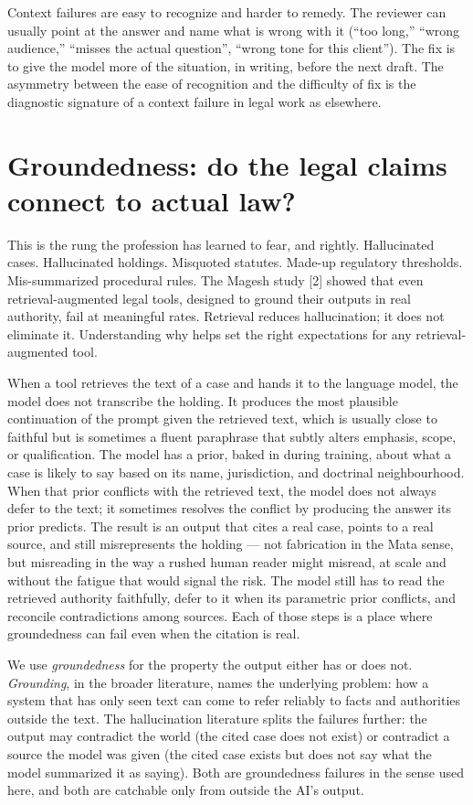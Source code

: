 \documentclass[11pt,a4paper]{article}
\begin{document}
Context failures are easy to recognize and harder to remedy. The
reviewer can usually point at the answer and name what is wrong
with it (``too long,'' ``wrong audience,'' ``misses the actual
question'', ``wrong tone for this client''). The fix is to give
the model more of the situation, in writing, before the next
draft. The asymmetry between the ease of recognition and the
difficulty of fix is the diagnostic signature of a context failure
in legal work as elsewhere.

\section*{Groundedness: do the legal claims connect to actual law?}

This is the rung the profession has learned to fear, and rightly.
Hallucinated cases. Hallucinated holdings. Misquoted statutes.
Made-up regulatory thresholds. Mis-summarized procedural rules.
The Magesh study [2] showed that even retrieval-augmented legal
tools, designed to ground their outputs in real authority, fail at
meaningful rates. Retrieval reduces hallucination; it does not
eliminate it. Understanding why helps set the right expectations
for any retrieval-augmented tool.

When a tool retrieves the text of a case and hands it to the
language model, the model does not transcribe the holding. It
produces the most plausible continuation of the prompt given the
retrieved text, which is usually close to faithful but is
sometimes a fluent paraphrase that subtly alters emphasis,
scope, or qualification. The model has a prior, baked in during
training, about what a case is likely to say based on its name,
jurisdiction, and doctrinal neighbourhood. When that prior
conflicts with the retrieved text, the model does not always
defer to the text; it sometimes resolves the conflict by
producing the answer its prior predicts. The result is an output
that cites a real case, points to a real source, and still
misrepresents the holding --- not fabrication in the Mata sense,
but misreading in the way a rushed human reader might misread,
at scale and without the fatigue that would signal the risk.
The model still has to read the retrieved authority
faithfully, defer to it when its parametric prior conflicts,
and reconcile contradictions among sources. Each of those steps
is a place where groundedness can fail even when the citation is
real.

We use \emph{groundedness} for the property the output either has
or does not. \emph{Grounding}, in the broader literature, names
the underlying problem: how a system that has only seen text can
come to refer reliably to facts and authorities outside the text.
The hallucination literature splits the failures further: the
output may contradict the world (the cited case does not exist) or
contradict a source the model was given (the cited case exists but
does not say what the model summarized it as saying). Both are
groundedness failures in the sense used here, and both are
catchable only from outside the AI's output.
\end{document}
